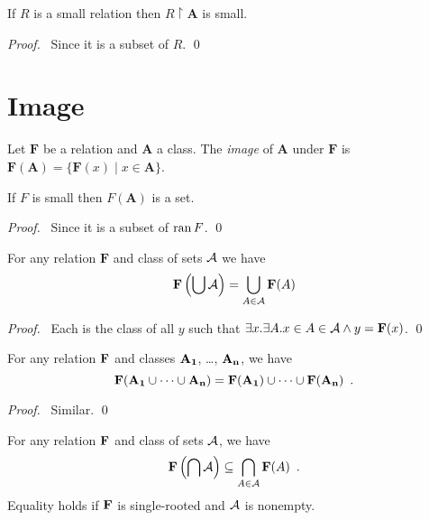 \begin{theorem}
    If $R$ is a small relation then $R \restriction \mathbf{A}$ is small.    
\end{theorem}

\begin{proof}
    \pf\ Since it is a subset of $R$. \qed
\end{proof}

\section{Image}

\begin{definition}[Image]
    Let $\mathbf{F}$ be a relation and $\mathbf{A}$ a class. The \emph{image} of $\mathbf{A}$
    under $\mathbf{F}$ is $\mathbf{F}(\mathbf{A}) = \{ \mathbf{F}(x) \mid x \in \mathbf{A} \}$.
\end{definition}

\begin{theorem}
    If $F$ is small then $F(\mathbf{A})$ is a set.
\end{theorem}

\begin{proof}
    \pf\ Since it is a subset of $\ran F$. \qed
\end{proof}

\begin{theorem}
    For any relation $\mathbf{F}$ and class of sets $\mathbf{\AA}$ we have
    \[ \mathbf{F} \left( \bigcup \mathbf{\AA} \right) = \bigcup_{A \in \mathbf{\AA}} \mathbf{F}(A) \]
\end{theorem}

\begin{proof}
    \pf\ Each is the class of all $y$ such that $\exists x. \exists A.
    x \in A \in \mathbf{\AA} \wedge y = \mathbf{F}(x)$. \qed
\end{proof}

\begin{theorem}
    For any relation $\mb{F}$ and classes $\mb{A_1}$, \ldots, $\mb{A_n}$, we have
    \[ \mb{F}(\mb{A_1} \cup \cdots \cup \mb{A_n}) = \mb{F}(\mb{A_1}) \cup \cdots \cup \mb{F}(\mb{A_n}) \enspace . \]
\end{theorem}

\begin{proof}
    \pf\ Similar. \qed
\end{proof}

\begin{theorem}
    For any relation $\mb{F}$ and class of sets $\mb{\AA}$, we have
    \[ \mb{F} \left( \bigcap \mb{\AA} \right) \subseteq \bigcap_{A \in \mb{\AA}} \mb{F}(A) \enspace . \]
    Equality holds if $\mb{F}$ is single-rooted and $\mb{\AA}$ is nonempty.
\end{theorem}

